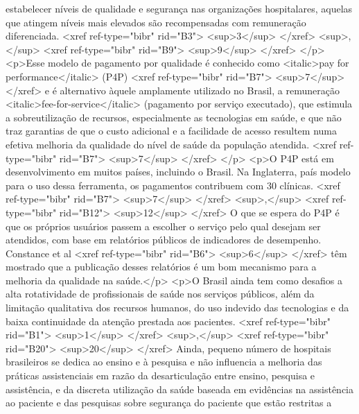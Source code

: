         estabelecer níveis de qualidade e segurança nas organizações hospitalares, aquelas que
        atingem níveis mais elevados são recompensadas com remuneração diferenciada. <xref
          ref-type="bibr" rid="B3">
          <sup>3</sup>
        </xref>
        <sup>,</sup>
        <xref ref-type="bibr" rid="B9">
          <sup>9</sup>
        </xref>
      </p>
      <p>Esse modelo de pagamento por qualidade é conhecido como <italic>pay for
          performance</italic> (P4P) <xref ref-type="bibr" rid="B7">
          <sup>7</sup>
        </xref> e é alternativo àquele amplamente utilizado no Brasil, a remuneração
          <italic>fee-for-service</italic> (pagamento por serviço executado), que estimula a
        sobreutilização de recursos, especialmente as tecnologias em saúde, e que não traz garantias
        de que o custo adicional e a facilidade de acesso resultem numa efetiva melhoria da
        qualidade do nível de saúde da população atendida. <xref ref-type="bibr" rid="B7">
          <sup>7</sup>
        </xref>
      </p>
      <p>O P4P está em desenvolvimento em muitos países, incluindo o Brasil. Na Inglaterra, país
        modelo para o uso dessa ferramenta, os pagamentos contribuem com 30%
        clínicas. <xref ref-type="bibr" rid="B7">
          <sup>7</sup>
        </xref>
        <sup>,</sup>
        <xref ref-type="bibr" rid="B12">
          <sup>12</sup>
        </xref> O que se espera do P4P é que os próprios usuários passem a escolher o serviço pelo
        qual desejam ser atendidos, com base em relatórios públicos de indicadores de desempenho.
        Constance et al <xref ref-type="bibr" rid="B6">
          <sup>6</sup>
        </xref> têm mostrado que a publicação desses relatórios é um bom mecanismo para a melhoria
        da qualidade na saúde.</p>
      <p>O Brasil ainda tem como desafios a alta rotatividade de profissionais de saúde nos serviços
        públicos, além da limitação qualitativa dos recursos humanos, do uso indevido das
        tecnologias e da baixa continuidade da atenção prestada aos pacientes. <xref ref-type="bibr"
          rid="B1">
          <sup>1</sup>
        </xref>
        <sup>,</sup>
        <xref ref-type="bibr" rid="B20">
          <sup>20</sup>
        </xref> Ainda, pequeno número de hospitais brasileiros se dedica ao ensino e à pesquisa e
        não influencia a melhoria das práticas assistenciais em razão da desarticulação entre
        ensino, pesquisa e assistência, e da discreta utilização da saúde baseada em evidências na
        assistência ao paciente e das pesquisas sobre segurança do paciente que estão restritas a
